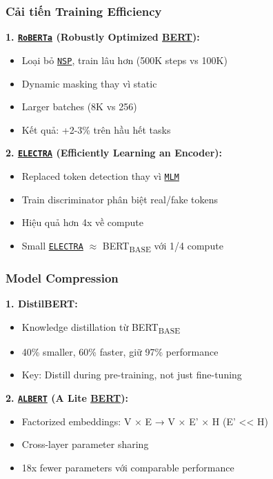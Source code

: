 \subsubsection{Cải tiến Training Efficiency}

\textbf{1. \hyperref[acro:roberta]{\texttt{RoBERTa}} (Robustly Optimized \hyperref[acro:bert]{\textbf{BERT}}):}
\begin{itemize}
    \item Loại bỏ \hyperref[acro:nsp]{\texttt{NSP}}, train lâu hơn (500K steps vs 100K)
    \item Dynamic masking thay vì static
    \item Larger batches (8K vs 256)
    \item Kết quả: +2-3\% trên hầu hết tasks
\end{itemize}

\textbf{2.
\hyperref[acro:electra]{\texttt{ELECTRA}} (Efficiently Learning an Encoder):}
\begin{itemize}
    \item Replaced token detection thay vì \hyperref[acro:mlm]{\texttt{MLM}}
    \item Train discriminator phân biệt real/fake tokens
    \item Hiệu quả hơn 4x về compute
    \item Small \hyperref[acro:electra]{\texttt{ELECTRA}} $\approx$ BERT\textsubscript{BASE} với 1/4 compute
\end{itemize}

\subsubsection{Model Compression}

\textbf{1.
DistilBERT:}
\begin{itemize}
    \item Knowledge distillation từ BERT\textsubscript{BASE}
    \item 40\% smaller, 60\% faster, giữ 97\% performance
    \item Key: Distill during pre-training, not just fine-tuning
\end{itemize}

\textbf{2.
\hyperref[acro:albert]{\texttt{ALBERT}} (A Lite \hyperref[acro:bert]{\textbf{BERT}}):}
\begin{itemize}
    \item Factorized embeddings: V × E → V × E' × H (E' << H)
    \item Cross-layer parameter sharing
    \item 18x fewer parameters với comparable performance
\end{itemize}

